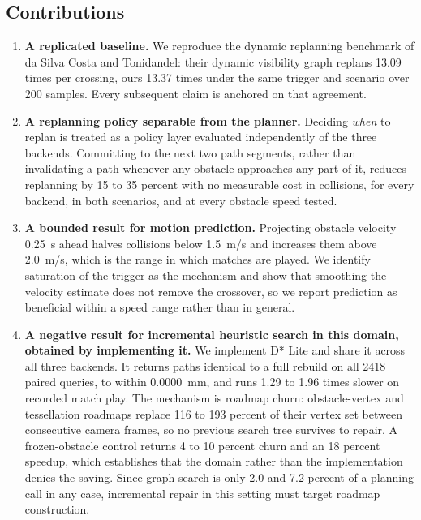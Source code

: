 \subsection{Contributions}

\begin{enumerate}
\item \textbf{A replicated baseline.} We reproduce the dynamic replanning
benchmark of da Silva Costa and Tonidandel: their dynamic visibility graph
replans 13.09 times per crossing, ours 13.37 times under the same trigger and
scenario over 200 samples. Every subsequent claim is anchored on that
agreement.

\item \textbf{A replanning policy separable from the planner.} Deciding
\emph{when} to replan is treated as a policy layer evaluated independently of
the three backends. Committing to the next two path segments, rather than
invalidating a path whenever any obstacle approaches any part of it, reduces
replanning by 15 to 35 percent with no measurable cost in collisions, for
every backend, in both scenarios, and at every obstacle speed tested.

\item \textbf{A bounded result for motion prediction.} Projecting obstacle
velocity 0.25~s ahead halves collisions below 1.5~m/s and increases them above
2.0~m/s, which is the range in which matches are played. We identify saturation
of the trigger as the mechanism and show that smoothing the velocity estimate
does not remove the crossover, so we report prediction as beneficial within a
speed range rather than in general.

\item \textbf{A negative result for incremental heuristic search in this
domain, obtained by implementing it.} We implement D* Lite and share it across
all three backends. It returns paths identical to a full rebuild on all 2418
paired queries, to within $0.0000$~mm, and runs 1.29 to 1.96 times slower on
recorded match play. The mechanism is roadmap churn: obstacle-vertex and
tessellation roadmaps replace 116 to 193 percent of their vertex set between
consecutive camera frames, so no previous search tree survives to repair. A
frozen-obstacle control returns 4 to 10 percent churn and an 18 percent
speedup, which establishes that the domain rather than the implementation
denies the saving. Since graph search is only 2.0 and 7.2 percent of a
planning call in any case, incremental repair in this setting must target
roadmap construction.


\end{enumerate}

